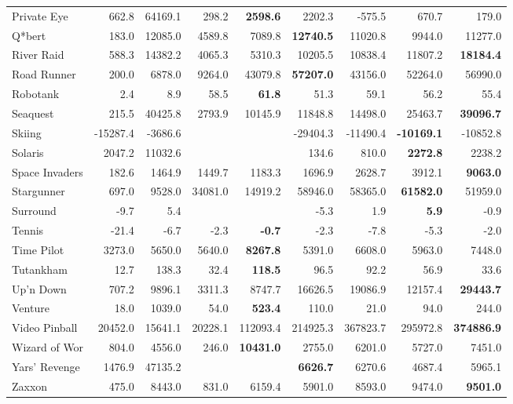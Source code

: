 \documentclass[a4paper]{article}
\begin{document}
\begin{table}[p]
{{\begin{tabular}{|l|rr|rrr|rrr|}
Private Eye  & 662.8 & 64169.1 & 298.2 & \textbf{2598.6} & 2202.3 & -575.5 & 670.7 & 179.0\\
Q*bert  & 183.0 & 12085.0 & 4589.8 & 7089.8 & \textbf{12740.5} & 11020.8 & 9944.0 & 11277.0\\
River Raid  & 588.3 & 14382.2 & 4065.3 & 5310.3 & 10205.5 & 10838.4 & 11807.2 & \textbf{18184.4}\\
Road Runner  & 200.0 & 6878.0 & 9264.0 & 43079.8 & \textbf{57207.0} & 43156.0 & 52264.0 & 56990.0\\
Robotank  & 2.4 & 8.9 & 58.5 & \textbf{61.8} & 51.3 & 59.1 & 56.2 & 55.4\\
Seaquest  & 215.5 & 40425.8 & 2793.9 & 10145.9 & 11848.8 & 14498.0 & 25463.7 & \textbf{39096.7}\\
Skiing  & -15287.4 & -3686.6 &  &  & -29404.3 & -11490.4 & \textbf{-10169.1} & -10852.8\\
Solaris  & 2047.2 & 11032.6 &  &  & 134.6 & 810.0 & \textbf{2272.8} & 2238.2\\
Space Invaders  & 182.6 & 1464.9 & 1449.7 & 1183.3 & 1696.9 & 2628.7 & 3912.1 & \textbf{9063.0}\\
Stargunner  & 697.0 & 9528.0 & 34081.0 & 14919.2 & 58946.0 & 58365.0 & \textbf{61582.0} & 51959.0\\
Surround  & -9.7 & 5.4 &  &  & -5.3 & 1.9 & \textbf{5.9} & -0.9\\
Tennis  & -21.4 & -6.7 & -2.3 & \textbf{-0.7} & -2.3 & -7.8 & -5.3 & -2.0\\
Time Pilot  & 3273.0 & 5650.0 & 5640.0 & \textbf{8267.8} & 5391.0 & 6608.0 & 5963.0 & 7448.0\\
Tutankham  & 12.7 & 138.3 & 32.4 & \textbf{118.5} & 96.5 & 92.2 & 56.9 & 33.6\\
Up'n Down  & 707.2 & 9896.1 & 3311.3 & 8747.7 & 16626.5 & 19086.9 & 12157.4 & \textbf{29443.7}\\
Venture  & 18.0 & 1039.0 & 54.0 & \textbf{523.4} & 110.0 & 21.0 & 94.0 & 244.0\\
Video Pinball  & 20452.0 & 15641.1 & 20228.1 & 112093.4 & 214925.3 & 367823.7 & 295972.8 & \textbf{374886.9}\\
Wizard of Wor  & 804.0 & 4556.0 & 246.0 & \textbf{10431.0} & 2755.0 & 6201.0 & 5727.0 & 7451.0\\
Yars' Revenge  & 1476.9 & 47135.2 &  &  & \textbf{6626.7} & 6270.6 & 4687.4 & 5965.1\\
Zaxxon  & 475.0 & 8443.0 & 831.0 & 6159.4 & 5901.0 & 8593.0 & 9474.0 & \textbf{9501.0}\\
\hline
\end{tabular}

}}
\end{table}
\end{document}
